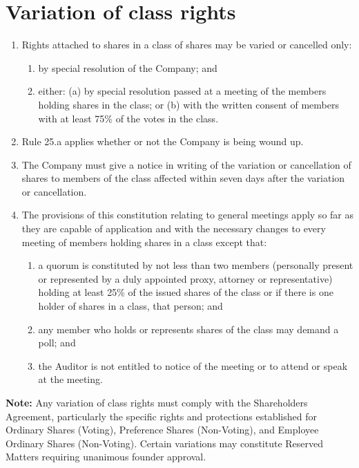 \section{Variation of class rights}

\begin{enumerate}[label=(\alph*)]
    \item Rights attached to shares in a class of shares may be varied or cancelled only:
    \begin{enumerate}[label=(\roman*)]
        \item by special resolution of the Company; and
        \item either: (a) by special resolution passed at a meeting of the members holding shares in the class; or (b) with the written consent of members with at least 75\% of the votes in the class.
    \end{enumerate}
    
    \item Rule 25.a applies whether or not the Company is being wound up.
    
    \item The Company must give a notice in writing of the variation or cancellation of shares to members of the class affected within seven days after the variation or cancellation.
    
    \item The provisions of this constitution relating to general meetings apply so far as they are capable of application and with the necessary changes to every meeting of members holding shares in a class except that:
    \begin{enumerate}[label=(\roman*)]
        \item a quorum is constituted by not less than two members (personally present or represented by a duly appointed proxy, attorney or representative) holding at least 25\% of the issued shares of the class or if there is one holder of shares in a class, that person; and
        \item any member who holds or represents shares of the class may demand a poll; and
        \item the Auditor is not entitled to notice of the meeting or to attend or speak at the meeting.
    \end{enumerate}
\end{enumerate}

\textbf{Note:} Any variation of class rights must comply with the Shareholders Agreement, particularly the specific rights and protections established for Ordinary Shares (Voting), Preference Shares (Non-Voting), and Employee Ordinary Shares (Non-Voting). Certain variations may constitute Reserved Matters requiring unanimous founder approval. 
